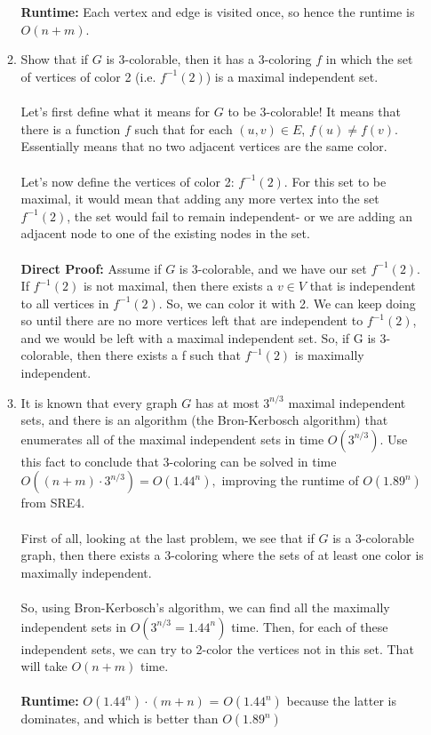 \documentclass[11pt]{article}
\begin{document}
\begin{enumerate}
\begin{enumerate}
        \\\\ \textbf{Runtime: } Each vertex and edge is visited once, so hence the runtime is $O(n + m)$.
        \\
        \item Show that if $G$ is 3-colorable, then it has a 3-coloring $f$ in which the set of vertices of color 2 (i.e. $f^{-1}(2)$) is a maximal independent set.
        \\\\ Let's first define what it means for $G$ to be 3-colorable! It means that there is a function $f$ such that for each $(u, v) \in E$, $f(u) \neq f(v)$. Essentially means that no two adjacent vertices are the same color.
        \\\\ Let's now define the vertices of color 2: $f^{-1}(2)$. For this set to be maximal, it would mean that adding any more vertex into the set $f^{-1}(2)$, the set would fail to remain independent- or we are adding an adjacent node to one of the existing nodes in the set. 
        \\\\ \textbf{Direct Proof:} Assume if $G$ is 3-colorable, and we have our set $f^{-1}(2)$. If $f^{-1}(2)$ is not maximal, then there exists a $v \in V$ that is independent to all vertices in $f^{-1}(2)$. So, we can color it with 2. We can keep doing so until there are no more vertices left that are independent to $f^{-1}(2)$, and we would be left with a maximal independent set. So, if G is 3-colorable, then there exists a f such that $f^{-1}(2)$ is maximally independent. \\

        \item It is known that every graph $G$ has at most $3^{n/3}$ maximal independent sets, and there is an algorithm (the Bron-Kerbosch algorithm) that enumerates all of the maximal independent sets in time $O(3^{n/3}).$  Use this fact to conclude that 3-coloring can be solved in time $O((n+m)\cdot 3^{n/3}) = O(1.44^n),$ improving the runtime of $O(1.89^n)$ from SRE4.\\
        \\ First of all, looking at the last problem, we see that if $G$ is a 3-colorable graph, then there exists a 3-coloring where the sets of at least one color is maximally independent. 
        \\\\ So, using Bron-Kerbosch's algorithm, we can find all the maximally independent sets in $O(3^{n/3} = 1.44^n)$ time. Then, for each of these independent sets, we can try to 2-color the vertices not in this set. That will take $O(n+m)$ time.
        \\\\ \textbf{Runtime:} $O(1.44^n) \cdot (m+n)$ = $O(1.44^n)$ because the latter is dominates, and which is better than $O(1.89^n)$
    \end{enumerate}
 

\end{enumerate}
\end{document}

